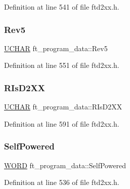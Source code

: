 Definition at line 541 of file ftd2xx.\+h.

\mbox{\label{structft__program__data_a512aeedfb289bc6cda7aa28da4d5d40e}} 
\subsubsection{\texorpdfstring{Rev5}{Rev5}}
{\footnotesize\ttfamily \hyperlink{CatCaloProto40MHz_2inc_2WinTypes_8h_a4f4bb67531a9bf6f0b9c6ad76aeba587}{U\+C\+H\+AR} ft\+\_\+program\+\_\+data\+::\+Rev5}



Definition at line 551 of file ftd2xx.\+h.

\mbox{\label{structft__program__data_aec99738794a078897df1e4b893117f82}} 
\subsubsection{\texorpdfstring{R\+Is\+D2\+XX}{RIsD2XX}}
{\footnotesize\ttfamily \hyperlink{CatCaloProto40MHz_2inc_2WinTypes_8h_a4f4bb67531a9bf6f0b9c6ad76aeba587}{U\+C\+H\+AR} ft\+\_\+program\+\_\+data\+::\+R\+Is\+D2\+XX}



Definition at line 591 of file ftd2xx.\+h.

\mbox{\label{structft__program__data_ad714af31e3592d4c3be2742ae9612616}} 
\subsubsection{\texorpdfstring{Self\+Powered}{SelfPowered}}
{\footnotesize\ttfamily \hyperlink{CatCaloProto40MHz_2inc_2WinTypes_8h_a197942eefa7db30960ae396d68339b97}{W\+O\+RD} ft\+\_\+program\+\_\+data\+::\+Self\+Powered}



Definition at line 536 of file ftd2xx.\+h.

